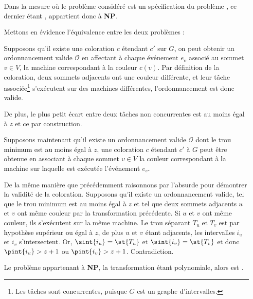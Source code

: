 Dans la mesure où le problème considéré est un spécification du problème \fischedpi{}, ce dernier
étant \npc{}, \unitfischedpi{} appartient donc à \textbf{NP}.

Mettons en évidence l'équivalence entre les deux problèmes :
\begin{bitemize}
    \item Supposons qu'il existe une coloration $c$ étendant $c'$ sur $G$, on peut obtenir un
        ordonnancement valide $\mathcal{O}$ en affectant à chaque événement $e_v$ associé au sommet
        $v \in V$, la machine correspondant à la couleur $c(v)$. Par définition de la coloration,
        deux sommets adjacents ont une couleur différente, et leur tâche associée\footnote{Les
        tâches sont concurrentes, puisque $G$ est un graphe d'intervalles.} s'exécutent sur des
        machines différentes, l'ordonnancement est donc valide. 

        De plus, le plus petit écart entre deux tâches non concurrentes est au moins égal à
        $z$ et ce par construction.
    \item Supposons maintenant qu'il existe un ordonnancement valide $\mathcal{O}$ dont le trou
        minimum est au moins égal à $z$, une coloration $c$ étendant $c'$ à $G$ peut être obtenue en
        associant à chaque sommet $v \in V$ la couleur correspondant à la machine sur laquelle est
        exécutée l'événement $e_v$.

        De la même manière que précédemment raisonnons par l'absurde pour démontrer la validité de
        la coloration. Supposons qu'il existe un ordonnancement valide, tel que le trou minimum est
        au moins égal à $z$ et tel que deux sommets adjacents $u$ et $v$ ont même couleur par la
        transformation précédente. Si $u$ et $v$ ont même couleur, ils s'exécutent sur la même
        machine. Le trou séparant $T_u$ et $T_v$ est par hypothèse supérieur ou égal à $z$, de plus
        $u$ et $v$ étant adjacents, les intervalles $i_u$ et $i_v$ s'intersectent. Or, $\sint{i_u} =
        \st{T_u}$ et $\sint{i_v} = \st{T_v}$ et donc $\pint{i_u} > z+1$ ou $\pint{i_v} > z+1$.
        Contradiction.
\end{bitemize}

Le problème \unitfischedpi{} appartenant à \textbf{NP}, la transformation étant polynomiale, alors
\unitfischedpi{} est \npc{}.

